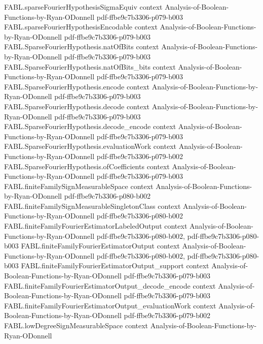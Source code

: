 \begin{theorem}
\proofstep
  {FABL.sparseFourierHypothesisSigmaEquiv}
  {context}
  {Analysis-of-Boolean-Functions-by-Ryan-ODonnell}
  {pdf-ffbe9c7b3306-p079-b003}
\proofstep
  {FABL.sparseFourierHypothesisEncodable}
  {context}
  {Analysis-of-Boolean-Functions-by-Ryan-ODonnell}
  {pdf-ffbe9c7b3306-p079-b003}
\proofstep
  {FABL.SparseFourierHypothesis.natOfBits}
  {context}
  {Analysis-of-Boolean-Functions-by-Ryan-ODonnell}
  {pdf-ffbe9c7b3306-p079-b003}
\proofstep
  {FABL.SparseFourierHypothesis.natOfBits_bits}
  {context}
  {Analysis-of-Boolean-Functions-by-Ryan-ODonnell}
  {pdf-ffbe9c7b3306-p079-b003}
\proofstep
  {FABL.SparseFourierHypothesis.encode}
  {context}
  {Analysis-of-Boolean-Functions-by-Ryan-ODonnell}
  {pdf-ffbe9c7b3306-p079-b003}
\proofstep
  {FABL.SparseFourierHypothesis.decode}
  {context}
  {Analysis-of-Boolean-Functions-by-Ryan-ODonnell}
  {pdf-ffbe9c7b3306-p079-b003}
\proofstep
  {FABL.SparseFourierHypothesis.decode_encode}
  {context}
  {Analysis-of-Boolean-Functions-by-Ryan-ODonnell}
  {pdf-ffbe9c7b3306-p079-b003}
\proofstep
  {FABL.SparseFourierHypothesis.evaluationWork}
  {context}
  {Analysis-of-Boolean-Functions-by-Ryan-ODonnell}
  {pdf-ffbe9c7b3306-p079-b002}
\proofstep
  {FABL.SparseFourierHypothesis.ofCoefficients}
  {context}
  {Analysis-of-Boolean-Functions-by-Ryan-ODonnell}
  {pdf-ffbe9c7b3306-p079-b003}
\proofstep
  {FABL.finiteFamilySignMeasurableSpace}
  {context}
  {Analysis-of-Boolean-Functions-by-Ryan-ODonnell}
  {pdf-ffbe9c7b3306-p080-b002}
\proofstep
  {FABL.finiteFamilySignMeasurableSingletonClass}
  {context}
  {Analysis-of-Boolean-Functions-by-Ryan-ODonnell}
  {pdf-ffbe9c7b3306-p080-b002}
\proofstep
  {FABL.finiteFamilyFourierEstimatorLabeledOutput}
  {context}
  {Analysis-of-Boolean-Functions-by-Ryan-ODonnell}
  {pdf-ffbe9c7b3306-p080-b002,
    pdf-ffbe9c7b3306-p080-b003}
\proofstep
  {FABL.finiteFamilyFourierEstimatorOutput}
  {context}
  {Analysis-of-Boolean-Functions-by-Ryan-ODonnell}
  {pdf-ffbe9c7b3306-p080-b002,
    pdf-ffbe9c7b3306-p080-b003}
\proofstep
  {FABL.finiteFamilyFourierEstimatorOutput_support}
  {context}
  {Analysis-of-Boolean-Functions-by-Ryan-ODonnell}
  {pdf-ffbe9c7b3306-p079-b003}
\proofstep
  {FABL.finiteFamilyFourierEstimatorOutput_decode_encode}
  {context}
  {Analysis-of-Boolean-Functions-by-Ryan-ODonnell}
  {pdf-ffbe9c7b3306-p079-b003}
\proofstep
  {FABL.finiteFamilyFourierEstimatorOutput_evaluationWork}
  {context}
  {Analysis-of-Boolean-Functions-by-Ryan-ODonnell}
  {pdf-ffbe9c7b3306-p079-b002}
\proofstep
  {FABL.lowDegreeSignMeasurableSpace}
  {context}
  {Analysis-of-Boolean-Functions-by-Ryan-ODonnell}

\end{theorem}
